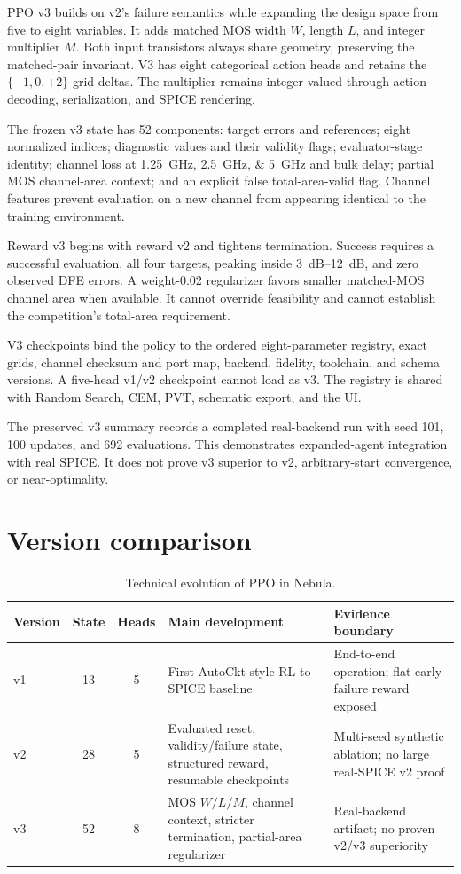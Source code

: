 PPO v3 builds on v2's failure semantics while expanding the design space from
five to eight variables. It adds matched MOS width $W$, length $L$, and integer
multiplier $M$. Both input transistors always share geometry, preserving the
matched-pair invariant. V3 has eight categorical action heads and retains the
$\{-1,0,+2\}$ grid deltas. The multiplier remains integer-valued through action
decoding, serialization, and SPICE rendering.

The frozen v3 state has 52 components: target errors and references; eight
normalized indices; diagnostic values and their validity flags; evaluator-stage
identity; channel loss at \SIlist{1.25;2.5;5}{GHz} and bulk delay; partial MOS
channel-area context; and an explicit false total-area-valid flag. Channel
features prevent evaluation on a new channel from appearing identical to the
training environment.

Reward v3 begins with reward v2 and tightens termination. Success requires a
successful evaluation, all four targets, peaking inside \SIrange{3}{12}{dB}, and
zero observed DFE errors. A weight-0.02 regularizer favors smaller matched-MOS
channel area when available. It cannot override feasibility and cannot establish
the competition's total-area requirement.

V3 checkpoints bind the policy to the ordered eight-parameter registry, exact
grids, channel checksum and port map, backend, fidelity, toolchain, and schema
versions. A five-head v1/v2 checkpoint cannot load as v3. The registry is shared
with Random Search, CEM, PVT, schematic export, and the UI.

The preserved v3 summary records a completed real-backend run with seed 101,
100 updates, and 692 evaluations. This demonstrates expanded-agent integration
with real SPICE. It does not prove v3 superior to v2, arbitrary-start convergence,
or near-optimality.

\section{Version comparison}

\begin{table}[htbp]
\centering
\caption{Technical evolution of PPO in Nebula.}
\label{tab:ppo-versions}
\begin{tabularx}{\textwidth}{@{}l c c X X@{}}
\toprule
Version & State & Heads & Main development & Evidence boundary \\
\midrule
v1 & 13 & 5 & First AutoCkt-style RL-to-SPICE baseline & End-to-end operation; flat early-failure reward exposed \\
v2 & 28 & 5 & Evaluated reset, validity/failure state, structured reward, resumable checkpoints & Multi-seed synthetic ablation; no large real-SPICE v2 proof \\
v3 & 52 & 8 & MOS $W/L/M$, channel context, stricter termination, partial-area regularizer & Real-backend artifact; no proven v2/v3 superiority \\
\bottomrule
\end{tabularx}
\end{table}

